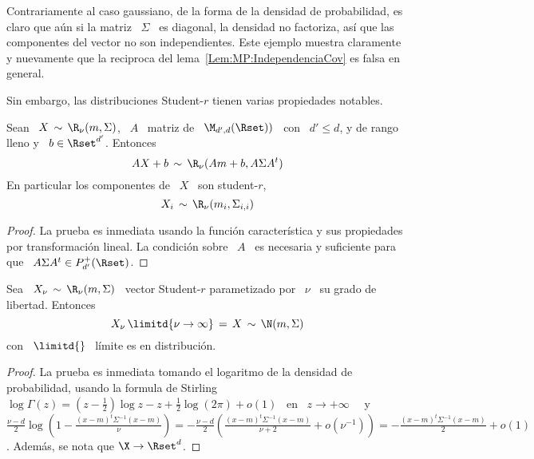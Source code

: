 Contrariamente al caso gaussiano, de la forma de la densidad de probabilidad, es
claro que a\'un si la matriz \ $\Sigma$ \ es diagonal, la densidad no factoriza,
as\'i  que las  componentes  del  vector no  son  independientes.  Este  ejemplo
muestra     claramente     y     nuevamente     que     la     reciproca     del
lema~\ref{Lem:MP:IndependenciaCov} es falsa en general.

Sin embargo, las distribuciones Student-$r$ tienen varias propiedades notables.

\begin{lema}
\label{Lem:MP:StabilidadLinealStudentR}
%
  Sean \ $X \, \sim \,  \R_\nu(m,\Sigma)$, \ $A$ \ matriz de \ $\M_{d',d}(\Rset))$
  \ con \ $d' \le d$, y de rango lleno y \ $b \in \Rset^{d'}$. Entonces
  \[
  A X + b\, \sim \, \R_\nu( A m + b , A \Sigma A^t)
  \]
  En particular los componentes de \ $X$ \ son student-$r$,
  \[
  X_i \, \sim \, \R_\nu(m_i , \Sigma_{i,i} )
  \]
\end{lema}
\begin{proof}
  La prueba es inmediata usando  la funci\'on caracter\'istica y sus propiedades
  por  transformaci\'on lineal.  La condici\'on  sobre \  $A$ \  es  necesaria y
  suficiente para que \ $A \Sigma A^t \in P_{d'}^+(\Rset)$.
\end{proof}

\begin{lema}
\label{Lem:MP:LimiteStudentRGaussiana}
%
  Sea \  $X_\nu \, \sim  \, \R_\nu(m,\Sigma)$ \ vector  Student-$r$ parametizado
  por \ $\nu$ \ su grado de libertad. Entonces
  \[
  X_\nu \, \limitd{\nu \to \infty} \, = \, X \, \sim \, \N(m,\Sigma)
  \]
  con \ $\displaystyle \limitd{}$ \ l\'imite es en distribuci\'on.
\end{lema}
\begin{proof}
  La prueba  es inmediata tomando el  logaritmo de la  densidad de probabilidad,
  usando la  formula de Stirling \  $\log\Gamma(z) = \left( z  - \frac12 \right)
  \log z - z  + \frac12 \log(2 \pi) + o(1)$ \  en \ $z \to +\infty$~\cite{Sti30,
    AbrSte70,  GraRyz15} \  y \  $\frac{\nu-d}{2} \log\left(  1  - \frac{(x-m)^t
      \Sigma^{-1} (x-m)}{\nu}  \right) = -  \frac{\nu-d}{2} \left( \frac{(x-m)^t
      \Sigma^{-1}  (x-m)}{\nu+2}   +  o\left(  \nu^{-1}  \right)   \right)  =  -
  \frac{(x-m)^t \Sigma^{-1}  (x-m)}{2} +  o(1)$. Adem\'as, se  nota que  $\X \to
  \Rset^d$.
\end{proof}

